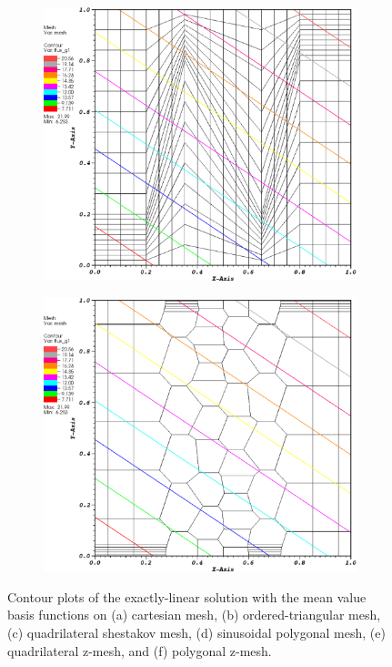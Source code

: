 \begin{figure}
\begin{subfigure}[b]{0.45\textwidth}
		\caption{}
	\end{subfigure}
	\vfill
	\begin{subfigure}[b]{0.45\textwidth}
		\centering
		\label{subfig::z_quad_mv_lin_sol}
		\includegraphics[width=\textwidth]{figures/sec_BF/z_quad_MV_k1.eps}
		\caption{}
	\end{subfigure}
	\hfill
	\begin{subfigure}[b]{0.45\textwidth}
		\centering
		\label{subfig::z_poly_mv_lin_sol}
		\includegraphics[width=\textwidth]{figures/sec_BF/z_poly_MV_k1.eps}
		\caption{}
	\end{subfigure}
\caption{Contour plots of the exactly-linear solution with the mean value basis functions on (a) cartesian mesh, (b) ordered-triangular mesh, (c) quadrilateral shestakov mesh, (d) sinusoidal polygonal mesh, (e) quadrilateral z-mesh, and (f) polygonal z-mesh.}
\label{fig::BF_Results_Linear_mv_sol}
\end{figure}

